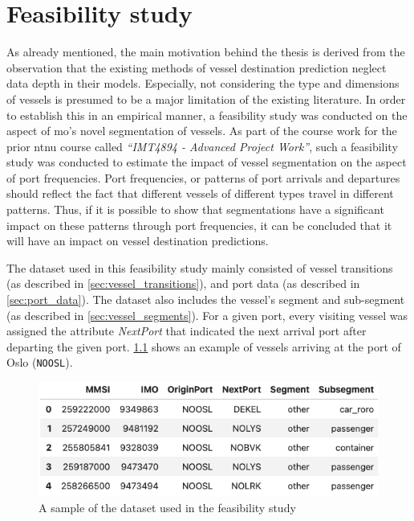 \chapter{Feasibility study}

As already mentioned, the main motivation behind the thesis is derived from the observation that the existing methods of vessel destination prediction neglect data depth in their models. Especially, not considering the type and dimensions of vessels is presumed to be a major limitation of the existing literature. In order to establish this in an empirical manner, a feasibility study was conducted on the aspect of \acrfull{mo}'s novel segmentation of vessels. As part of the course work for the prior \acrshort{ntnu} course called \textit{“IMT4894 - Advanced Project Work”}, such a feasibility study was  conducted to estimate the impact of vessel segmentation on the aspect of port frequencies. Port frequencies, or patterns of port arrivals and departures should reflect the fact that different vessels of different types travel in different patterns. Thus, if it is possible to show that segmentations have a significant impact on these patterns through port frequencies, it can be concluded that it will have an impact on vessel destination predictions.

The dataset used in this feasibility study mainly consisted of vessel transitions (as described in \cref{sec:vessel_transitions}), and port data (as described in \cref{sec:port_data}). The dataset also includes the vessel's segment and sub-segment (as described in \cref{sec:vessel_segments}). For a given port, every visiting vessel was assigned the attribute \textit{NextPort} that indicated the next arrival port after departing the given port. \cref{fig:apw_dataset} shows an example of vessels arriving at the port of Oslo (\texttt{NOOSL}).

\begin{figure}[htbp]  %
    \centering
    \includegraphics[width=.8\textwidth]{figures/apw/apw_dataset.png}
    \caption{A sample of the dataset used in the feasibility study}
    \label{fig:apw_dataset}
\end{figure}

